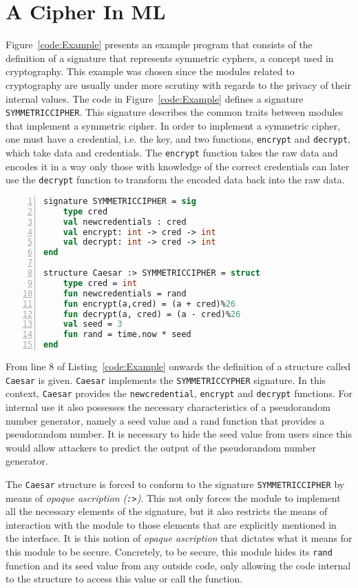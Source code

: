 \documentclass[10pt,a4paper]{report}
\begin{document}
\section{A Cipher In ML\label{sec:MLExample}}
Figure~\ref{code:Example} presents an example program that consists of the definition of a signature that represents symmetric cyphers, a concept used in cryptography. This example was chosen since the modules related to cryptography are usually under more scrutiny with regards to the privacy of their internal values.
The code in Figure~\ref{code:Example} defines a signature \texttt{SYMMETRICCIPHER}. This signature describes the common traits between modules that implement a symmetric cipher.
In order to implement a symmetric cipher, one must have a credential, i.e. the key, and two functions, \texttt{encrypt} and \texttt{decrypt}, which take data and credentials.
The \texttt{encrypt} function takes the raw data and encodes it in a way only those with knowledge of the correct credentials can later use the \texttt{decrypt} function to transform the encoded data back into the raw data.

\begin{lstlisting}[frame=single, language=ML,numbers=left, label=code:Example, caption=Example of a security sensitive module specifying and implementing a symmetric cypher.]
signature SYMMETRICCIPHER = sig 
    type cred
    val newcredentials : cred
    val encrypt: int -> cred -> int
    val decrypt: int -> cred -> int
end

structure Caesar :> SYMMETRICCIPHER = struct
    type cred = int
    fun newcredentials = rand
    fun encrypt(a,cred) = (a + cred)%26
    fun decrypt(a, cred) = (a - cred)%26
    val seed = 3
    fun rand = time.now * seed
end
\end{lstlisting}

From line 8 of Listing~\ref{code:Example} onwards the definition of a structure called \texttt{Caesar} is given. \texttt{Caesar} implements the \texttt{SYMMETRICCYPHER} signature.
In this context, \texttt{Caesar} provides the \texttt{newcredential}, \texttt{encrypt} and \texttt{decrypt} functions. For internal use it also possesses the necessary characteristics of a pseudorandom number generator, namely a seed value and a rand function that provides a pseudorandom number. It is necessary to hide the seed value from users since this would allow attackers to predict the output of the pseudorandom number generator.

The \texttt{Caesar} structure is forced to conform to the signature \texttt{SYMMETRICCIPHER} by means of \emph{opaque ascription (\texttt{:>})}. This not only forces the module to implement all the necessary elements of the signature, but it also restricts the means of interaction with the module to those elements that are explicitly mentioned in the interface. It is this notion of \emph{opaque ascription} that dictates what it means for this module to be secure. Concretely, to be secure, this module hides its \texttt{rand} function and its seed value from any outside code, only allowing the code internal to the structure to access this value or call the function.
\end{document}
